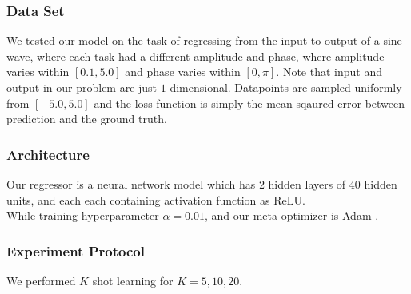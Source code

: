 \documentclass[a4paper]{article}
\begin{document}
\subsubsection{Data Set}
We tested our model on the task of regressing from the input to output of a sine wave,
where each task had a different amplitude and phase, where amplitude varies within $[0.1, 5.0]$ and phase varies within $[0, \pi]$. 
Note that input and output in our problem are just $1$ dimensional. 
Datapoints are sampled uniformly from $[-5.0, 5.0]$ and the loss function is simply the mean sqaured error between prediction and the ground truth.

\subsubsection{Architecture}
Our regressor is a neural network model which has $2$ hidden layers of $40$ hidden units, and each each containing activation function as ReLU. \\
While training hyperparameter $\alpha = 0.01$, and our meta optimizer is Adam \cite{adam}. 

\subsubsection{Experiment Protocol}
We performed $K$ shot learning for $K = 5, 10, 20$.
\end{document}
